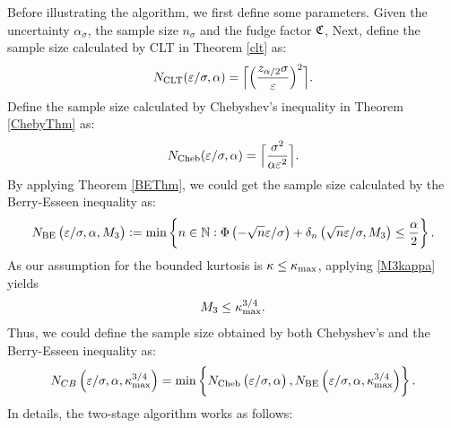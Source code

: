 \documentclass{iitthesis}
\theoremstyle{definition}
\begin{document}
Before illustrating the algorithm, we first define some parameters. Given the uncertainty $\alpha_{\sigma}$, the sample size $n_{\sigma}$ and the fudge factor $\mathfrak{C}$, 
Next, define the sample size calculated by CLT in Theorem \ref{clt} as:
\begin{equation}\label{NCLT}
N_{\mathrm{CLT}}(\varepsilon/\sigma,\alpha)
= 
\Bigl\lceil
\Bigl(
\frac{z_{\alpha/2}\sigma}{\varepsilon}
\Bigr)^2
\Bigr\rceil.
\end{equation}
Define the sample size calculated by Chebyshev's inequality in Theorem \ref{ChebyThm} as:
\begin{equation}\label{NCheby}
N_{\text{Cheb}}(\varepsilon/\sigma,\alpha)
= 
\Bigl\lceil\frac{\sigma^2}{\alpha\varepsilon^2}\Bigr\rceil.
\end{equation}
By applying Theorem \ref{BEThm}, we could get the sample size calculated by the Berry-Esseen inequality as:
\begin{equation}\label{NBE}
N_{\text{BE}}\left(\varepsilon/\sigma,\alpha,M_3\right) := \min \left \{ n \in \mathbb{N} : \Phi\left(-\sqrt{n}\varepsilon/\sigma  \right)+\delta_n\left(\sqrt{n}\varepsilon/\sigma,M_3\right)
\le \frac{\alpha}{2} \right \}.
\end{equation}
As our assumption for the bounded kurtosis is $\kappa \leq \kappa_{\max}$, applying \eqref{M3kappa} yields 
\begin{align}\label{M3kmax}
M_3 \leq \kappa_{\max}^{3/4}.
\end{align}
Thus, we could define the sample size obtained by both Chebyshev's and the Berry-Esseen inequality as:
\begin{align}\label{NCB}
N_{CB} \left(\varepsilon/\sigma,\alpha, \kappa_{\max}^{3/4}\right)  = \min \left \{ N_{\text{Cheb}}\left(\varepsilon/\sigma,\alpha\right),N_{\text{BE}}\left(\varepsilon/\sigma,\alpha, \kappa_{\max}^{3/4}\right)\right \}.
\end{align}
In details, the two-stage algorithm works as follows:
\end{document}
